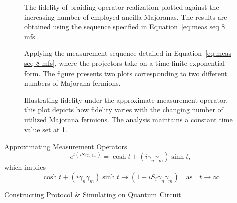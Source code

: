 \documentclass{loyola-beamer}
\begin{document}
\begin{frame}
	\begin{figure}
		\begin{center}
			
		\end{center}
		\caption{The fidelity of braiding operator realization plotted against the increasing number of employed ancilla Majoranas. The results are obtained using the sequence specified in Equation~\ref{eq:meas seq 8 mfs}.}
		\label{fig:fid vs N ideal}
	\end{figure}
\end{frame}

\begin{frame}
	\begin{figure}
		\begin{center}
			
		\end{center}
		\caption{Applying the measurement sequence detailed in Equation~\ref{eq:meas seq 8 mfs}, where the projectors take on a time-finite exponential form. The figure presents two plots corresponding to two different numbers of Majorana fermions.}
		\label{fig:fid with approx proj}
	\end{figure}
\end{frame}

\begin{frame}
	\begin{figure}
		\begin{center}
			
		\end{center}
		\caption{Illustrating fidelity under the approximate measurement operator, this plot depicts how fidelity varies with the changing number of utilized Majorana fermions. The analysis maintains a constant time value set at 1.}
		\label{fig:fid vs N t=1}
	\end{figure}
\end{frame}

\begin{frame}{Approximating Measurement Operators}
	\[
		e^{t ( iS_i \gamma_n \gamma_m )} = \cosh{t} + (i \gamma_n \gamma_m) \sinh{t},
	\]
	which implies
	\[
		\cosh{t} + (i \gamma_n \gamma_m) \sinh{t} \rightarrow (1 + i S_i \gamma_n \gamma_m)
		\quad \text{as} \quad t \rightarrow \infty
	\]
\end{frame}

\begin{titleframe}{Constructing Protocol \& Simulating on Quantum Circuit}
\end{titleframe}
\end{document}
